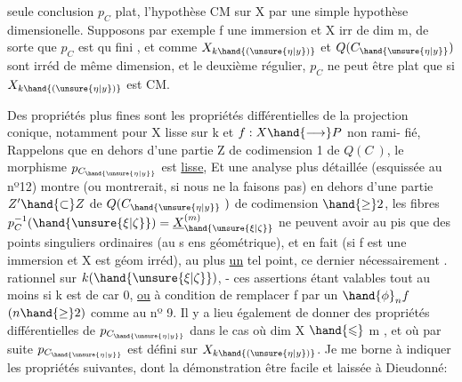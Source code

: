 seule conclusion $p_C$ plat, l'hypothèse CM sur X par une simple hypothèse
dimensionelle. Supposons par exemple f une immersion et X irr de dim m,
de sorte que $p_C$ est qu fini , et comme $X_{k\hand{(\unsure{\eta|y})}}$ et $Q(C_{\hand{\unsure{\eta|y}}})$ sont irréd de
même dimension,  et le deuxième régulier, $p_C$ ne peut être
plat que si $X_{k\hand{(\unsure{\eta|y})}}$ est CM.

Des propriétés plus fines sont les propriétés différentielles de
la projection conique, notamment pour X lisse sur k et $f:X\hand{\longrightarrow} P$ non rami-%
fié,   Rappelons que 
en dehors d'une partie Z de codimension 1 de $Q(C\ )$, le morphisme
$p_{C_{\hand{\unsure{\eta|y}}}}$  est \uline{lisse}, Et une analyse plus détaillée (esquissée au nº12) montre
(ou montrerait, si nous ne la faisons pas)   en dehors d'une partie $Z'\hand{\subset} Z$
de $Q(C_{\hand{\unsure{\eta|y}}}\ )$ de codimension $\hand{\geq} 2$, les fibres $p_C^{-1}(\hand{\unsure{\xi|\zeta}}) = \underline{X}^{(m)}_{\hand{\unsure{\xi|\zeta}}}$ ne peuvent
avoir au pis que des points  singuliers ordinaires (au s ens
géométrique), et en fait (si f est une immersion et X est géom irréd),
 au plus \uline{un} tel point, ce dernier   nécessairement  .
rationnel sur $k(\hand{\unsure{\xi|\zeta}})$, - ces assertions étant valables tout au moins si
k est de car 0, \uline{ou} à condition de remplacer f par un $\hand{\phi}_n f$ $(n\hand{\geq} 2)$ comme
au nº 9. Il y a lieu également de donner des propriétés différentielles
de $p_{C_{\hand{\unsure{\eta|y}}}}$ dans le cas où dim X $\hand{\leqslant}$ m , et où par suite $p_{C_{\hand{\unsure{\eta|y}}}}$ est défini sur $X_{k\hand{(\unsure{\eta|y})}}$.
Je me borne à indiquer les propriétés suivantes, dont la démonstration
 être facile et  laissée à Dieudonné:

